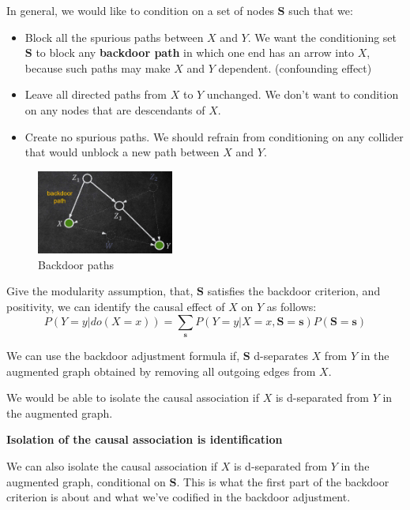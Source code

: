 In general, we would like to condition on a set of nodes $\mathbf{S}$ such that we:
\begin{itemize}
      \item Block all the spurious paths between $X$ and $Y$. We want the
            conditioning set $\mathbf{S}$ to block any \textbf{backdoor path} in
            which one end has an arrow into $X$, because such paths may make $X$
            and $Y$ dependent. (confounding effect)
      \item Leave all directed paths from $X$ to $Y$ unchanged. We don't want
            to condition on any nodes that are descendants of $X$.
      \item Create no spurious paths. We should refrain from conditioning on any
            collider that would unblock a new path between $X$ and $Y$.
\end{itemize}
\begin{figure}[!ht]
      \centering
      \includegraphics[width=0.4\textwidth]{img/causal_models/backdoor.png}
      \caption{Backdoor paths}
      \label{fig:backdoor}
\end{figure}
\begin{definition}
      Give the modularity assumption, that, $\mathbf{S}$ satisfies the backdoor 
      criterion, and positivity, we can identify the causal effect of $X$ on $Y$ 
      as follows:
      \begin{equation}
            P(Y = y| do(X = x)) = \sum_{\mathbf{s}} P(Y = y| X = x, \mathbf{S} = \mathbf{s})P(\mathbf{S} = \mathbf{s})
      \end{equation}
\end{definition}

We can use the backdoor adjustment formula if, $\mathbf{S}$ d-separates $X$ from 
$Y$ in the augmented graph obtained by removing all outgoing edges from $X$.

We would be able to isolate the causal association if $X$ is d-separated from
$Y$ in the augmented graph.
\begin{center}
      \textbf{Isolation of the causal association is identification}
\end{center}

We can also isolate the causal association if $X$ is d-separated from $Y$ in
the augmented graph, conditional on $\mathbf{S}$. This is what the first part of 
the backdoor criterion is about and what we've codified in the backdoor adjustment.